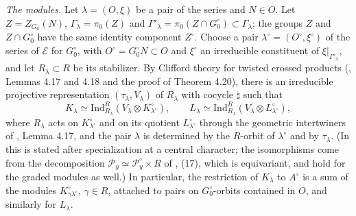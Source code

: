 \documentclass[a4paper,12pt,leqno]{amsart}
\theoremstyle{plain}
\theoremstyle{definition}
\begin{document}
\emph{The modules.} Let $\lambda=(O,\xi)$ be a pair of the series and $N\in O$. Let $Z=Z_{G_0}(N)$,
$\Gamma_\lambda=\pi_0(Z)$ and $\Gamma'_\lambda=\pi_0(Z\cap G_0^\circ)\subset\Gamma_\lambda$; the groups $Z$ and $Z\cap
G_0^\circ$ have the same identity component $Z^\circ$. Choose a pair $\lambda^\circ=(O^\circ,\xi^\circ)$ of the
series of $\mathcal E$ for $G_0^\circ$, with $O^\circ=G_0^\circ N\subset O$ and $\xi^\circ$ an irreducible
constituent of $\xi|_{\Gamma'_\lambda}$, and let $R_\lambda\subset R$ be its stabilizer. By Clifford theory for
twisted crossed products (\cite{AMS18}, Lemmas 4.17 and 4.18 and the proof of Theorem 4.20), there is an
irreducible projective representation $(\tau_\lambda,V_\lambda)$ of $R_\lambda$ with cocycle $\natural$ such
that
\[K_\lambda\simeq\mathrm{Ind}_{R_\lambda}^R(V_\lambda\otimes K^\circ_{\lambda^\circ}),\qquad
L_\lambda\simeq\mathrm{Ind}_{R_\lambda}^R(V_\lambda\otimes L^\circ_{\lambda^\circ}),\]
where $R_\lambda$ acts on $K^\circ_{\lambda^\circ}$ and on its quotient $L^\circ_{\lambda^\circ}$ through the
geometric intertwiners of \cite{AMS18}, Lemma 4.17, and the pair $\lambda$ is determined by the
$R$-orbit of $\lambda^\circ$ and by $\tau_\lambda$. (In \cite{AMS18} this is stated after specialization at a
central character; the isomorphisms come from the decomposition $\mathcal P_y\simeq\mathcal P^\circ_y\times R$
of \cite{AMS18}, (17), which is equivariant, and hold for the graded modules as well.) In particular,
the restriction of $K_\lambda$ to $A^\circ$ is a sum of the modules $K^\circ_{\gamma\lambda^\circ}$, $\gamma\in R$,
attached to pairs on $G_0^\circ$-orbits contained in $O$, and similarly for $L_\lambda$.
\end{document}
